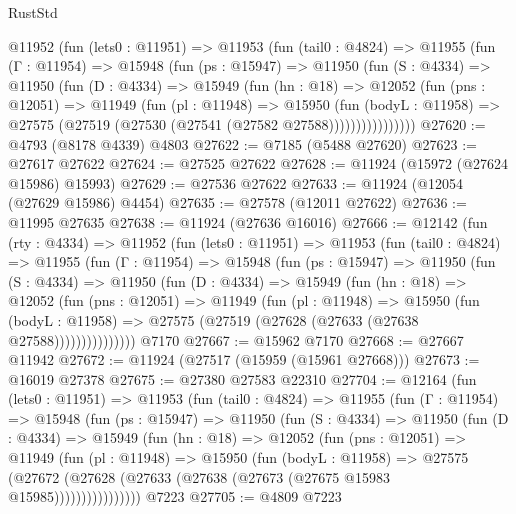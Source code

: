 \begin{lexlean}{RustStd}
\begin{coremodule}
{\begin{coremodule}
{{{{{{{{{{{{{{{{{{{{{{{{{{{{{{{{{{{{{{{{{{{{{{{{{{{{{{{{{{{{{{{{{{{{{{{{{{{{{{{{      @11952
        (fun (lets0 : @11951) =>
        @11953
          (fun (tail0 : @4824) =>
          @11955
            (fun (Γ : @11954) =>
            @15948
              (fun (ps : @15947) =>
              @11950
                (fun (S : @4334) =>
                @11950
                  (fun (D : @4334) =>
                  @15949
                    (fun (hn : @18) =>
                    @12052
                      (fun (pns : @12051) =>
                      @11949
                        (fun (pl : @11948) =>
                        @15950
                          (fun (bodyL : @11958) =>
                          @27575 (@27519 (@27530 (@27541 (@27582 @27588))))))))))))))))
@27620 := @4793 (@8178 @4339) @4803
@27622 := @7185 (@5488 @27620)
@27623 := @27617 @27622
@27624 := @27525 @27622
@27628 := @11924 (@15972 (@27624 @15986) @15993)
@27629 := @27536 @27622
@27633 := @11924 (@12054 (@27629 @15986) @4454)
@27635 := @27578 (@12011 @27622)
@27636 := @11995 @27635
@27638 := @11924 (@27636 @16016)
@27666 := @12142
    (fun (rty : @4334) =>
    @11952
      (fun (lets0 : @11951) =>
      @11953
        (fun (tail0 : @4824) =>
        @11955
          (fun (Γ : @11954) =>
          @15948
            (fun (ps : @15947) =>
            @11950
              (fun (S : @4334) =>
              @11950
                (fun (D : @4334) =>
                @15949
                  (fun (hn : @18) =>
                  @12052
                    (fun (pns : @12051) =>
                    @11949
                      (fun (pl : @11948) =>
                      @15950
                        (fun (bodyL : @11958) =>
                        @27575 (@27519 (@27628 (@27633 (@27638 @27588)))))))))))))))
    @7170
@27667 := @15962 @7170
@27668 := @27667 @11942
@27672 := @11924 (@27517 (@15959 (@15961 @27668)))
@27673 := @16019 @27378
@27675 := @27380 @27583 @22310
@27704 := @12164
    (fun (lets0 : @11951) =>
    @11953
      (fun (tail0 : @4824) =>
      @11955
        (fun (Γ : @11954) =>
        @15948
          (fun (ps : @15947) =>
          @11950
            (fun (S : @4334) =>
            @11950
              (fun (D : @4334) =>
              @15949
                (fun (hn : @18) =>
                @12052
                  (fun (pns : @12051) =>
                  @11949
                    (fun (pl : @11948) =>
                    @15950
                      (fun (bodyL : @11958) =>
                      @27575
                        (@27672
                          (@27628 (@27633 (@27638 (@27673 (@27675 @15983 @15985))))))))))))))))
    @7223
@27705 := @4809 @7223
}}}}}}}}}}}}}}}}}}}}}}}}}}}}}}}}}}}}}}}}}}}}}}}}}}}}}}}}}}}}}}}}}}}}}}}}}}}}}}}}
\end{coremodule}}
\end{coremodule}
\end{lexlean}
